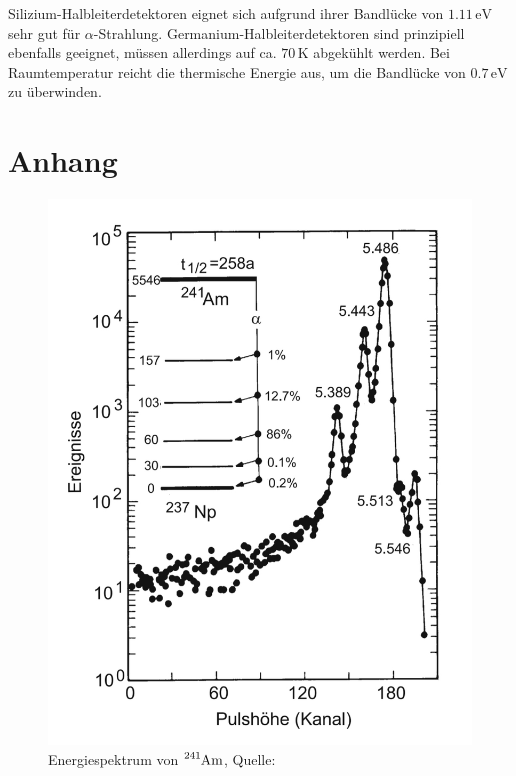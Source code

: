 \documentclass[12pt,a4paper]{scrartcl}
\numberwithin{equation}{section} %
\renewcommand{\[}{} %
\renewcommand{\]}{\noindent} %
\begin{document}
Silizium-Halbleiterdetektoren eignet sich aufgrund ihrer Bandlücke von
\(1.11\mathrm{\,eV}\) sehr gut für \(\alpha\)-Strahlung.
Germanium-Halbleiterdetektoren sind prinzipiell ebenfalls geeignet,
müssen allerdings auf ca. \(70\,\mathrm K\) abgekühlt werden. Bei
Raumtemperatur reicht die thermische Energie aus, um die Bandlücke von
\(0.7\mathrm{\,eV}\) zu überwinden.

\clearpage
\hypertarget{Anhang}{
	\section{Anhang}}
	
\begin{figure}[h!]
	\centering
	
	\begin{minipage}{0.45\textwidth}
		\centering
		\includegraphics[width=\textwidth]{../media/B3.3/Am241_Spektrum.jpg}
		\caption{Energiespektrum von \(\ce{^241Am}\), Quelle: \cite{Bethge}}
		\label{abb:Spektrum}
	\end{minipage}

\end{figure}
\end{document}
